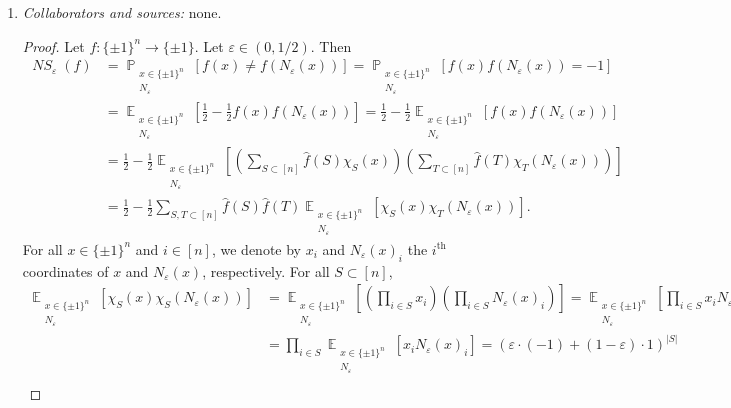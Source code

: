 \documentclass[letterpaper, reqno,11pt]{article}
\newcommand{\PP}{\mathop{{}\mathbb{P}}}
\newcommand{\EE}{\mathop{{}\mathbb{E}}}
\DeclareMathOperator{\NS}{\mathit{NS}}
\begin{document}
\begin{enumerate}
  \item \noindent\emph{Collaborators and sources:} none.
  
  \begin{proof}
    Let $f : \{ \pm 1 \}^n \to \{ \pm 1 \}$. Let $\varepsilon \in (0, 1/2)$. Then
    \begin{align*}
      \NS_\varepsilon(f) &= \PP_{\substack{x \in \{ \pm 1 \}^n \\ N_\varepsilon}} \left[f(x) \neq f\left(N_\varepsilon(x)\right)\right] = \PP_{\substack{x \in \{ \pm 1 \}^n \\ N_\varepsilon}} \left[f(x) f\left(N_\varepsilon(x)\right) = -1\right] \\
      &= \EE_{\substack{x \in \{ \pm 1 \}^n \\ N_\varepsilon}}\left[\frac{1}{2} - \frac{1}{2}f(x) f\left(N_\varepsilon(x)\right)\right] = \frac{1}{2} - \frac{1}{2} \EE_{\substack{x \in \{ \pm 1 \}^n \\ N_\varepsilon}}\left[f(x) f\left(N_\varepsilon(x)\right)\right] \\
      &= \frac{1}{2} - \frac{1}{2} \EE_{\substack{x \in \{ \pm 1 \}^n \\ N_\varepsilon}}\left[\left(\sum_{S \subset [n]} \hat{f}(S) \chi_S(x)\right) \left(\sum_{T \subset [n]} \hat{f}(T) \chi_T\left(N_\varepsilon(x)\right)\right)\right] \\
      &= \frac{1}{2} - \frac{1}{2} \sum_{S, T \subset [n]} \hat{f}(S) \hat{f}(T) \EE_{\substack{x \in \{ \pm 1 \}^n \\ N_\varepsilon}}\left[\chi_S(x) \chi_T\left(N_\varepsilon(x)\right)\right].
    \end{align*}
    For all $x \in \{ \pm 1 \}^n$ and $i \in [n]$, we denote by $x_i$ and $N_\varepsilon(x)_i$ the $i^\text{th}$ coordinates of $x$ and $N_\varepsilon(x)$, respectively. For all $S \subset [n]$,
    \begin{align}
      \EE_{\substack{x \in \{ \pm 1 \}^n \\ N_\varepsilon}}\left[\chi_S(x) \chi_S\left(N_\varepsilon(x)\right)\right] &= \EE_{\substack{x \in \{ \pm 1 \}^n \\ N_\varepsilon}} \left[\left(\prod_{i \in S} x_i\right)\left(\prod_{i \in S} N_\varepsilon(x)_i\right)\right] \nonumber = \EE_{\substack{x \in \{ \pm 1 \}^n \\ N_\varepsilon}}\left[\prod_{i \in S} x_i N_\varepsilon(x)_i\right] \nonumber \\
      &= \prod_{i \in S} \EE_{\substack{x \in \{ \pm 1 \}^n \\ N_\varepsilon}} \left[x_i N_\varepsilon(x)_i\right] = (\varepsilon \cdot (-1) + (1 - \varepsilon) \cdot 1)^{|S|} \label{eq:1-indep-symmetry} \\

\end{align}
\end{proof}
\end{enumerate}
\end{document}

